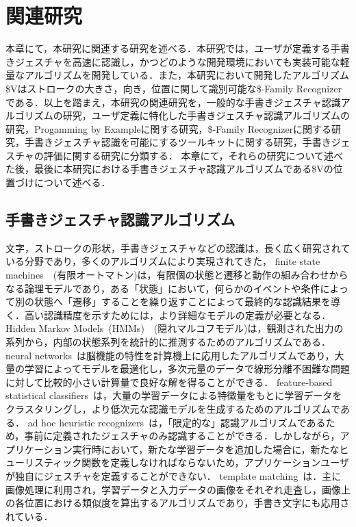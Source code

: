 \chapter{関連研究}
本章にて，本研究に関連する研究を述べる．本研究では，ユーザが定義する手書きジェスチャを高速に認識し，かつどのような開発環境においても実装可能な軽量なアルゴリズムを開発している．また，本研究において開発したアルゴリズム\$Vはストロークの大きさ，向き，位置に関して識別可能な\$-Family Recognizerである．以上を踏まえ，本研究の関連研究を，一般的な手書きジェスチャ認識アルゴリズムの研究，ユーザ定義に特化した手書きジェスチャ認識アルゴリズムの研究，Progamming by Exampleに関する研究，\$-Family Recognizerに関する研究，手書きジェスチャ認識を可能にするツールキットに関する研究，手書きジェスチャの評価に関する研究に分類する．
本章にて，それらの研究について述べた後，最後に本研究における手書きジェスチャ認識アルゴリズムである\$Vの位置づけについて述べる．

\section{手書きジェスチャ認識アルゴリズム}
文字，ストロークの形状，手書きジェスチャなどの認識は，長く広く研究されている分野であり，多くのアルゴリズムにより実現されてきた，
finite state machines~\cite{Hong00constructingfinite}~(有限オートマトン)は，有限個の状態と遷移と動作の組み合わせからなる論理モデルであり，ある「状態」において，何らかのイベントや条件によって別の状態へ「遷移」することを繰り返すことによって最終的な認識結果を導く．高い認識精度を示すためには，より詳細なモデルの定義が必要となる．
Hidden Markov Models~(HMMs)~\cite{Anderson2004HiddenMM,Sezgin:2005:HES:1040830.1040899, Cao:2005:EOA:1089508.1089540}~(隠れマルコフモデル)は，観測された出力の系列から，内部の状態系列を統計的に推測するためのアルゴリズムである．
neural networks~\cite{Pittman:1991:RHT:108844.108914}は脳機能の特性を計算機上に応用したアルゴリズムであり，大量の学習によってモデルを最適化し，多次元量のデータで線形分離不困難な問題に対して比較的小さい計算量で良好な解を得ることができる．
feature-based statistical classifiers~\cite{Cho:2006:NGR:1711617.1711649,Rubine:1991:SGE:127719.122753}は，大量の学習データによる特徴量をもとに学習データをクラスタリングし，より低次元な認識モデルを生成するためのアルゴリズムである．
ad hoc heuristic recognizers~\cite{Anthony:2010:LMR:1839214.1839258, Wilson:2003:XUI:642611.642706}は，「限定的な」認識アルゴリズムであるため，事前に定義されたジェスチャのみ認識することができる．しかしながら，アプリケーション実行時において，新たな学習データを追加した場合に，新たなヒューリスティック関数を定義しなければならないため，アプリケーションユーザが独自にジェスチャを定義することができない．
template matching~\cite{Kara:2005:ITS:1652319.1652712, Kristensson:2004:SLV:1029632.1029640}は．主に画像処理に利用され，学習データと入力データの画像をそれぞれ走査し，画像上の各位置における類似度を算出するアルゴリズムであり，手書き文字にも応用されている．

